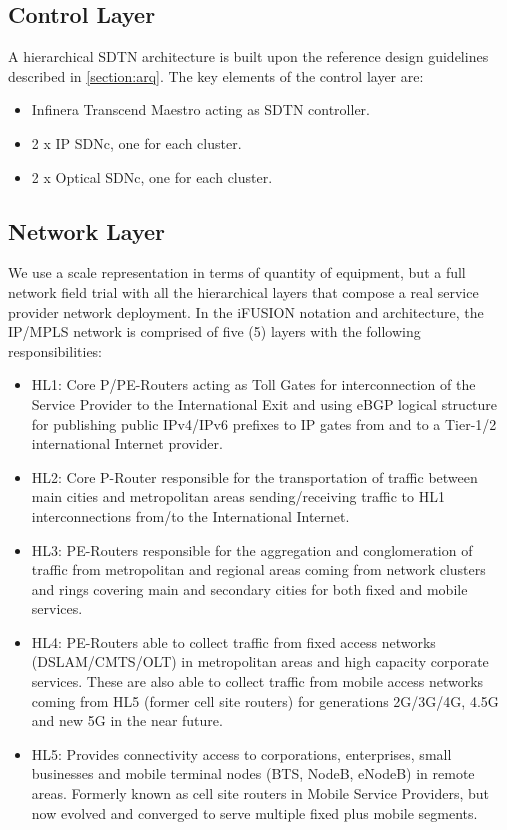 \documentclass[a4paper,fleqn]{cas-dc}
\begin{document}
\subsection{Control Layer}
\label{sec:contollay}
A hierarchical SDTN architecture is built upon the reference design guidelines described in \cref{section:arq}. The key elements of the control layer are:
\begin{itemize}
    \item Infinera Transcend Maestro acting as SDTN controller.
    \item 2 x IP SDNc, one for each cluster.
    \item 2 x Optical SDNc, one for each cluster.
\end{itemize}

\subsection{Network Layer}
\label{sec:netlay}
We use a scale representation in terms of quantity of equipment, but a full network field trial with all the hierarchical layers that compose a real service provider network deployment. In the iFUSION notation and architecture, the IP/MPLS network is comprised of five (5) layers with the following responsibilities: 
\begin{itemize}
    \item HL1: Core P/PE-Routers acting as Toll Gates for interconnection of the Service Provider to the International Exit and using eBGP logical structure for publishing public IPv4/IPv6 prefixes to IP gates from and to a Tier-1/2 international Internet provider.
    \item HL2: Core P-Router responsible for the transportation of traffic between main cities and metropolitan areas sending/receiving traffic to HL1 interconnections from/to the International Internet.
    \item HL3: PE-Routers responsible for the aggregation and conglomeration of traffic from metropolitan and regional areas coming from network clusters and rings covering main and secondary cities for both fixed and mobile services.
    \item HL4: PE-Routers able to collect traffic from fixed access networks (DSLAM/CMTS/OLT) in metropolitan areas and high capacity corporate services. These are also able to collect traffic from mobile access networks coming from HL5 (former cell site routers) for generations 2G/3G/4G, 4.5G and new 5G in the near future.
    \item HL5: Provides connectivity access to corporations, enterprises, small businesses and mobile terminal nodes (BTS, NodeB, eNodeB) in remote areas. Formerly known as cell site routers in Mobile Service Providers, but now evolved and converged to serve multiple fixed plus mobile segments.     
\end{itemize}
\end{document}
